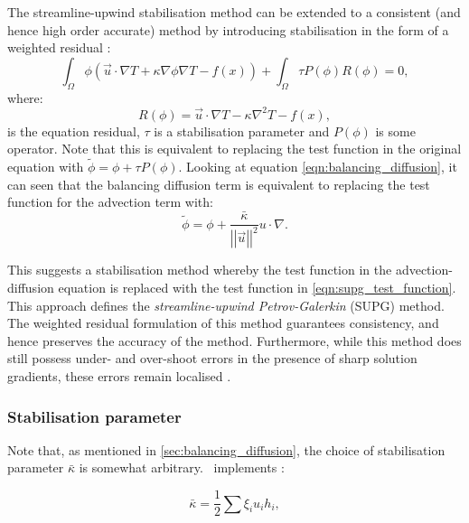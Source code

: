 The streamline-upwind stabilisation method can be extended to a consistent (and
hence high order accurate) method by introducing stabilisation in the form of a weighted
residual \citep{DoneaBook}:
\begin{equation*}
  \int_\Omega \phi (\vec{u} \cdot \nabla T + \kappa \nabla \phi \nabla T - f(x)) +
  \int_\Omega \tau P(\phi) R(\phi)
  = 0,
\end{equation*}
where:
\begin{equation*}
  R(\phi) = \vec{u} \cdot \nabla T - \kappa \nabla^2 T - f(x),
\end{equation*}
is the equation residual, $\tau$ is a stabilisation parameter and $P(\phi)$ is
some operator.
Note that this is equivalent to replacing the test function in the original
equation with $\tilde{\phi} = \phi + \tau P(\phi)$.
Looking at equation \eqref{eqn:balancing_diffusion}, it can seen that the
balancing diffusion term is equivalent to replacing the test function for the
advection term with:
\begin{equation}\label{eqn:supg_test_function}
  \tilde{\phi} = \phi + \frac{\bar{\kappa}}{\left|\left| \vec{u} \right|\right|^2} u \cdot \nabla.
\end{equation}

This suggests a stabilisation method whereby the test function in the advection-diffusion
equation is replaced with the test function in \eqref{eqn:supg_test_function}.
This approach defines the \textit{streamline-upwind Petrov-Galerkin} (SUPG) method. The
weighted residual formulation of this method guarantees consistency, and hence
preserves the accuracy of the method. Furthermore, while this method does
still possess under- and over-shoot errors in the presence of sharp solution
gradients, these errors remain localised \citep{hughes1987}.

\subsubsection{Stabilisation parameter}\label{sec:stabilisation_parameter}

Note that, as mentioned in \ref{sec:balancing_diffusion}, the choice of
stabilisation parameter $\bar{\kappa}$ is somewhat arbitrary. \fluidity\ implements \citep{brooks1982, DoneaBook}:

\begin{equation}\label{eqn:md_nu_bar}
  \bar{\kappa} = \frac{1}{2} \sum{\xi_i u_i h_i},
\end{equation}


